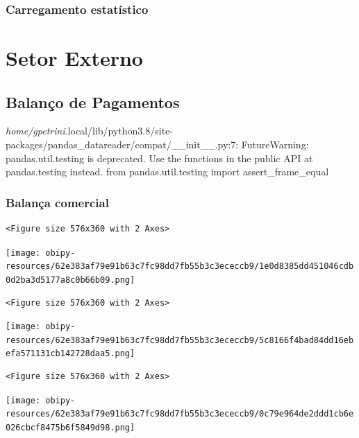 \documentclass[11pt]{article}
\begin{document}
\subsubsection{Carregamento estatístico}
\label{sec:orgfb20c0d}



\section{Setor Externo}
\label{sec:org2a2e416}


\subsection{Balanço de Pagamentos}
\label{sec:orgbb60065}

\emph{home/gpetrini}.local/lib/python3.8/site-packages/pandas\_datareader/compat/\_\_init\_\_.py:7: FutureWarning: pandas.util.testing is deprecated. Use the functions in the public API at pandas.testing instead.
  from pandas.util.testing import assert\_frame\_equal


\subsubsection{Balança comercial}
\label{sec:org5472022}

\begin{verbatim}
<Figure size 576x360 with 2 Axes>
\end{verbatim}


\begin{center}
\texttt{[image: obipy-resources/62e383af79e91b63c7fc98dd7fb55b3c3ececcb9/1e0d8385dd451046cdb0d2ba3d5177a8c0b66b09.png]}
\end{center}


\begin{verbatim}
<Figure size 576x360 with 2 Axes>
\end{verbatim}


\begin{center}
\texttt{[image: obipy-resources/62e383af79e91b63c7fc98dd7fb55b3c3ececcb9/5c8166f4bad84dd16ebefa571131cb142728daa5.png]}
\end{center}


\begin{verbatim}
<Figure size 576x360 with 2 Axes>
\end{verbatim}


\begin{center}
\texttt{[image: obipy-resources/62e383af79e91b63c7fc98dd7fb55b3c3ececcb9/0c79e964de2ddd1cb6e026cbcf8475b6f5849d98.png]}
\end{center}
\end{document}
